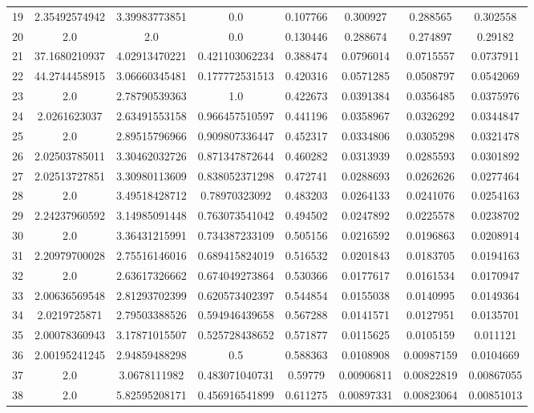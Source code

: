 \begin{longtable}{|c|c|c|c|c|c|c|c|}
19 & 2.35492574942 & 3.39983773851 & 0.0 & 0.107766 & 0.300927 & 0.288565 & 0.302558 \\
20 & 2.0 & 2.0 & 0.0 & 0.130446 & 0.288674 & 0.274897 & 0.29182 \\
21 & 37.1680210937 & 4.02913470221 & 0.421103062234 & 0.388474 & 0.0796014 & 0.0715557 & 0.0737911 \\
22 & 44.2744458915 & 3.06660345481 & 0.177772531513 & 0.420316 & 0.0571285 & 0.0508797 & 0.0542069 \\
23 & 2.0 & 2.78790539363 & 1.0 & 0.422673 & 0.0391384 & 0.0356485 & 0.0375976 \\
24 & 2.0261623037 & 2.63491553158 & 0.966457510597 & 0.441196 & 0.0358967 & 0.0326292 & 0.0344847 \\
25 & 2.0 & 2.89515796966 & 0.909807336447 & 0.452317 & 0.0334806 & 0.0305298 & 0.0321478 \\
26 & 2.02503785011 & 3.30462032726 & 0.871347872644 & 0.460282 & 0.0313939 & 0.0285593 & 0.0301892 \\
27 & 2.02513727851 & 3.30980113609 & 0.838052371298 & 0.472741 & 0.0288693 & 0.0262626 & 0.0277464 \\
28 & 2.0 & 3.49518428712 & 0.78970323092 & 0.483203 & 0.0264133 & 0.0241076 & 0.0254163 \\
29 & 2.24237960592 & 3.14985091448 & 0.763073541042 & 0.494502 & 0.0247892 & 0.0225578 & 0.0238702 \\
30 & 2.0 & 3.36431215991 & 0.734387233109 & 0.505156 & 0.0216592 & 0.0196863 & 0.0208914 \\
31 & 2.20979700028 & 2.75516146016 & 0.689415824019 & 0.516532 & 0.0201843 & 0.0183705 & 0.0194163 \\
32 & 2.0 & 2.63617326662 & 0.674049273864 & 0.530366 & 0.0177617 & 0.0161534 & 0.0170947 \\
33 & 2.00636569548 & 2.81293702399 & 0.620573402397 & 0.544854 & 0.0155038 & 0.0140995 & 0.0149364 \\
34 & 2.0219725871 & 2.79503388526 & 0.594946439658 & 0.567288 & 0.0141571 & 0.0127951 & 0.0135701 \\
35 & 2.00078360943 & 3.17871015507 & 0.525728438652 & 0.571877 & 0.0115625 & 0.0105159 & 0.011121 \\
36 & 2.00195241245 & 2.94859488298 & 0.5 & 0.588363 & 0.0108908 & 0.00987159 & 0.0104669 \\
37 & 2.0 & 3.0678111982 & 0.483071040731 & 0.59779 & 0.00906811 & 0.00822819 & 0.00867055 \\
38 & 2.0 & 5.82595208171 & 0.456916541899 & 0.611275 & 0.00897331 & 0.00823064 & 0.00851013 \\

\end{longtable}
